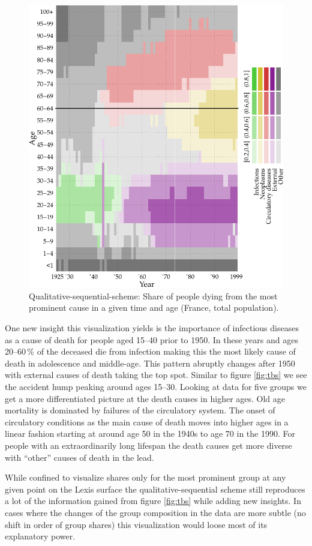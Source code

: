 \documentclass[a4paper]{scrartcl}
\begin{document}
\begin{figure}[htb!]
  \centering
  \includegraphics[width = 0.8\linewidth]{../fig/plot-qual_seq.pdf}
  \caption{Qualitative-sequential-scheme: Share of people dying from the most prominent cause in a given time and age (France, total population).}
  \label{fig:qss}
\end{figure}

One new insight this visualization yields is the importance of infectious diseases as a cause of death for people aged 15--40 prior to 1950. In these years and ages 20--60\,\% of the deceased die from infection making this the most likely cause of death in adolescence and middle-age. This pattern abruptly changes after 1950 with external causes of death taking the top spot. Similar to figure \ref{fig:tbs} we see the accident hump peaking around ages 15--30. Looking at data for five groups we get a more differentiated picture at the death causes in higher ages. Old age mortality is dominated by failures of the circulatory system. The onset of circulatory conditions as the main cause of death moves into higher ages in a linear fashion starting at around age 50 in the 1940s to age 70 in the 1990. For people with an extraordinarily long lifespan the death causes get more diverse with \enquote{other} causes of death in the lead.

While confined to visualize shares only for the most prominent group at any given point on the Lexis surface the qualitative-sequential scheme still reproduces a lot of the information gained from figure \ref{fig:tbs} while adding new insights. In cases where the changes of the group composition in the data are more subtle (no shift in order of group shares) this visualization would loose most of its explanatory power.
\end{document}
